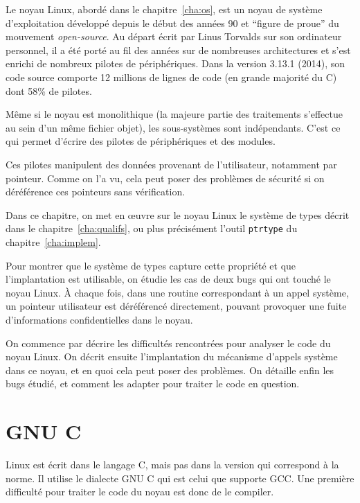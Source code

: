 
Le noyau Linux, abordé dans le chapitre~\ref{cha:os}, est un noyau de système
d'exploitation développé depuis le début des années 90 et \enquote{figure de
proue} du mouvement \emph{open-source}. Au départ écrit par Linus Torvalds sur
son ordinateur personnel, il a été porté au fil des années sur de nombreuses
architectures et s'est enrichi de nombreux pilotes de périphériques. Dans la
version 3.13.1 (2014), son code source comporte 12 millions de lignes de code
(en grande majorité du C) dont 58\% de pilotes.


Même si le noyau est monolithique (la majeure partie des traitements s'effectue
au sein d'un même fichier objet), les sous-systèmes sont indépendants. C'est ce
qui permet d'écrire des pilotes de périphériques et des modules.

Ces pilotes manipulent des données provenant de l'utilisateur, notamment par
pointeur. Comme on l'a vu, cela peut poser des problèmes de sécurité si on
déréférence ces pointeurs sans vérification.

Dans ce chapitre, on met en œuvre sur le noyau Linux le système de types décrit
dans le chapitre~\ref{cha:qualifs}, ou plus précisément l'outil \texttt{ptrtype}
du chapitre~\ref{cha:implem}.

Pour montrer que le système de types capture cette propriété et que
l'implantation est utilisable, on étudie les cas de deux bugs qui ont touché le
noyau Linux. À chaque fois, dans une routine correspondant à un appel système,
un pointeur utilisateur est déréférencé directement, pouvant provoquer une fuite
d'informations confidentielles dans le noyau.

On commence par décrire les difficultés rencontrées pour analyser le code du
noyau Linux. On décrit ensuite l'implantation du mécanisme d'appels système dans
ce noyau, et en quoi cela peut poser des problèmes. On détaille enfin les bugs
étudié, et comment les adapter pour traiter le code en question.

\section{GNU C}
\label{sec:gnuc}

Linux est écrit dans le langage C, mais pas dans la version qui correspond à la
norme. Il utilise le dialecte GNU C qui est celui que supporte GCC. Une première
difficulté pour traiter le code du noyau est donc de le compiler.

